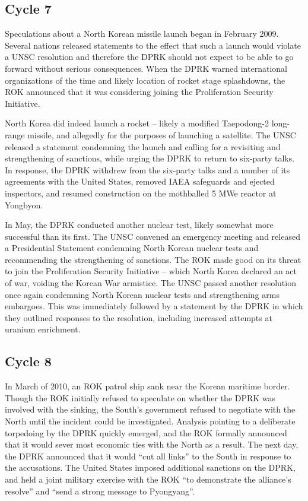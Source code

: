 \documentclass{article}
\begin{document}
\subsection{Cycle 7}

Speculations about a North Korean missile launch began in February 2009. Several nations released statements to the effect that such a launch would violate a UNSC resolution and therefore the DPRK should not expect to be able to go forward without serious consequences\cite{davenport}. When the DPRK warned international organizations of the time and likely location of rocket stage splashdowns, the ROK announced that it was considering joining the Proliferation Security Initiative\cite{davenport}.

North Korea did indeed launch a rocket – likely a modified Taepodong-2 long-range missile, and allegedly for the purposes of launching a satellite\cite{davenport}. The UNSC released a statement condemning the launch and calling for a revisiting and strengthening of sanctions, while urging the DPRK to return to six-party talks\cite{unsc09}. In response, the DPRK withdrew from the six-party talks and a number of its agreements with the United States\cite{niksch}, removed IAEA safeguards and ejected inspectors\cite{iaea09}, and resumed construction on the mothballed 5 MWe reactor at Yongbyon\cite{nti15}.

In May, the DPRK conducted another nuclear test, likely somewhat more successful than its first\cite{nti15}. The UNSC convened an emergency meeting and released a Presidential Statement condemning North Korean nuclear tests and recommending the strengthening of sanctions\cite{unsc09p}. The ROK made good on its threat to join the Proliferation Security Initiative – which North Korea declared an act of war, voiding the Korean War armistice\cite{glionna}. The UNSC passed another resolution once again condemning North Korean nuclear tests and strengthening arms embargoes\cite{unsc09j}. This was immediately followed by a statement by the DPRK in which they outlined responses to the resolution, including increased attempts at uranium enrichment\cite{nti15}.

\subsection{Cycle 8}

In March of 2010, an ROK patrol ship sank near the Korean maritime border\cite{branigan}. Though the ROK initially refused to speculate on whether the DPRK was involved with the sinking\cite{branigan}, the South’s government refused to negotiate with the North until the incident could be investigated\cite{davenport}. Analysis pointing to a deliberate torpedoing by the DPRK quickly emerged\cite{reuters}, and the ROK formally announced that it would sever most economic ties with the North as a result. The next day, the DPRK announced that it would “cut all links” to the South in response to the accusations\cite{davenport}. The United States imposed additional sanctions on the DPRK, and held a joint military exercise with the ROK “to demonstrate the alliance’s resolve” and “send a strong message to Pyongyang”\cite{starr}.
\end{document}
